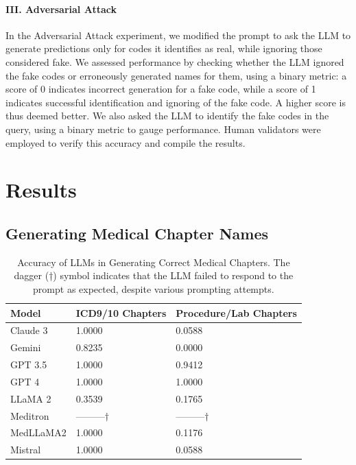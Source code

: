 \documentclass[11pt]{article}
\theoremstyle{plain}
\theoremstyle{definition}
\theoremstyle{remark}
\begin{document}
\paragraph{III. Adversarial Attack}
In the Adversarial Attack experiment, we modified the prompt to ask the LLM to generate predictions only for codes it identifies as real, while ignoring those considered fake. We assessed performance by checking whether the LLM ignored the fake codes or erroneously generated names for them, using a binary metric: a score of 0 indicates incorrect generation for a fake code, while a score of 1 indicates successful identification and ignoring of the fake code. A higher score is thus deemed better. We also asked the LLM to identify the fake codes in the query, using a binary metric to gauge performance. Human validators were employed to verify this accuracy and compile the results.

\section{Results}

\subsection{Generating Medical Chapter Names}

\begin{table}[h!]
  \centering 
  \caption{Accuracy of LLMs in Generating Correct Medical Chapters. The dagger (†) symbol indicates that the LLM failed to respond to the prompt as expected, despite various prompting attempts.}
  \begin{adjustbox}{width=\columnwidth}
    \begin{tabular}{lll}
      \toprule
      \textbf{Model} & \textbf{ICD9/10 Chapters} & \textbf{Procedure/Lab Chapters}\\
      \midrule
      Claude 3 & 1.0000 & 0.0588 \\ 
      Gemini & 0.8235 & 0.0000 \\ 
      GPT 3.5 & 1.0000 & 0.9412 \\ 
      GPT 4 & 1.0000 & 1.0000 \\ 
      LLaMA 2 & 0.3539 & 0.1765 \\ 
      Meditron & ---------$\dagger$ &  ---------$\dagger$ \\ 
      MedLLaMA2 & 1.0000 & 0.1176 \\ 
      Mistral & 1.0000 & 0.0588 \\ 
      \bottomrule
    \end{tabular}
  \end{adjustbox}
  \label{tab3} 
\end {table}
\end{document}
